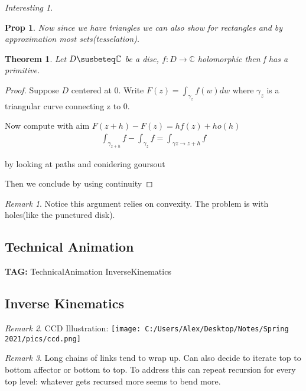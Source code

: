 \documentclass[11pt]{article}
\newcommand{\C}{\mathbb{C}}
\newtheorem{theorem}{Theorem}
\newtheorem{prop}{Prop}
\theoremstyle{remark}
\newtheorem{remark}{Remark}
\newtheorem{interest}{Interesting}
\begin{document}
\begin{interest}
\begin{prop}
	Now since we have triangles we can also show for rectangles and by approximation most sets(tesselation). 
\end{prop}

\begin{theorem}
	Let $D \susbeteq \C$ be a disc, $f: D \to \C$ holomorphic then f has a primitive. 
\end{theorem}

\begin{proof}
	Suppose $D$ centered at 0. Write $F(z) = \int_{\gamma_z} f(w)dw$ where $\gamma_z$ is a triangular curve connecting z to 0. 

	Now compute with aim $F(z+h) - F(z) = hf(z)+ho(h) $
	\begin{align*}
		\int_{\gamma_{z+h}} f - \int_{\gamma_z}f = \int_{\gamma{z \to z+h}} f 
	\end{align*}

	by looking at paths and conidering goursout

	Then we conclude by using continuity 
\end{proof}

\begin{remark}
	Notice this argument relies on convexity. The problem is with holes(like the punctured disk).
\end{remark}

\subsection{Technical Animation}

\textbf{TAG:} TechnicalAnimation InverseKinematics

\subsection{Inverse Kinematics}

\begin{remark}
	CCD Illustration:
	\texttt{[image: C:/Users/Alex/Desktop/Notes/Spring 2021/pics/ccd.png]}
\end{remark}

\begin{remark}
	Long chains of links tend to wrap up. Can also decide to iterate top to bottom affector or bottom to top. To address this can repeat recursion for every top level: whatever gets recursed more seems to bend more.
\end{remark}


\end{interest}
\end{document}
